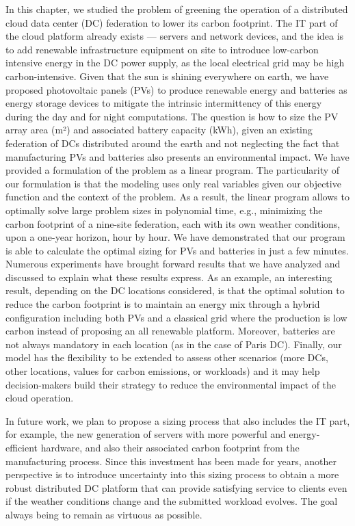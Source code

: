 In this chapter, we studied the problem of greening the operation of a distributed cloud data center (DC) federation to lower its carbon footprint. The IT part of the cloud platform already exists --- servers and network devices, and the idea is to add renewable infrastructure equipment on site to introduce low-carbon intensive energy in the DC power supply, as the local electrical grid may be high carbon-intensive. Given that the sun is shining everywhere on earth, we have proposed photovoltaic panels (PVs) to produce renewable energy and batteries as energy storage devices to mitigate the intrinsic intermittency of this energy during the day and for night computations. The question is how to size the PV array area (m²) and associated battery capacity (kWh), given an existing federation of DCs distributed around the earth and not neglecting the fact that manufacturing PVs and batteries also presents an environmental impact. We have provided a formulation of the problem as a linear program. The particularity of our formulation is that the modeling uses only real variables given our objective function and the context of the problem. As a result, the linear program allows to optimally solve large problem sizes in polynomial time, e.g., minimizing the carbon footprint of a nine-site federation, each with its own weather conditions, upon a one-year horizon, hour by hour. We have demonstrated that our program is able to calculate the optimal sizing for PVs and batteries in just a few minutes. Numerous experiments have brought forward results that we have analyzed and discussed to explain what these results express. As an example, an interesting result, depending on the DC locations considered, is that the optimal solution to reduce the carbon footprint is to maintain an energy mix through a hybrid configuration including both PVs and a classical grid where the production is low carbon instead of proposing an all renewable platform. Moreover, batteries are not always mandatory in each location (as in the case of Paris DC). Finally, our model has the flexibility to be extended to assess other scenarios (more DCs, other locations, values for  carbon emissions, or workloads) and it may help decision-makers build their strategy to reduce the environmental impact of the cloud operation. 

In future work, we plan to propose a sizing process that also includes the IT part, for example, the new generation of servers with more powerful and energy-efficient hardware, and also their associated carbon footprint from the manufacturing process. Since this investment has been made for years, another perspective is to introduce uncertainty into this sizing process to obtain a more robust distributed DC platform that can provide satisfying service to clients even if the weather conditions change and the submitted workload evolves. The goal always being to remain as virtuous as possible. 
